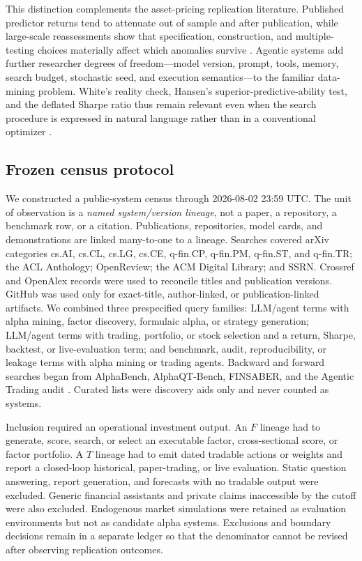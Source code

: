 This distinction complements the asset-pricing replication literature.
Published predictor returns tend to attenuate out of sample and after
publication, while large-scale reassessments show that specification,
construction, and multiple-testing choices materially affect which anomalies
survive \citep{McLeanPontiff2016,HarveyLiuZhu2016,hou2020replicating,ChenZimmermann2022,JensenKellyPedersen2023}.
Agentic systems add further researcher degrees of freedom---model version,
prompt, tools, memory, search budget, stochastic seed, and execution
semantics---to the familiar data-mining problem.  White's reality check,
Hansen's superior-predictive-ability test, and the deflated Sharpe ratio thus
remain relevant even when the search procedure is expressed in natural
language rather than in a conventional optimizer
\citep{White2000RealityCheck,Hansen2005SPA}.

\subsection{Frozen census protocol}

We constructed a public-system census through 2026-08-02 23:59 UTC.  The unit
of observation is a \emph{named system/version lineage}, not a paper, a
repository, a benchmark row, or a citation.  Publications, repositories,
model cards, and demonstrations are linked many-to-one to a lineage.  Searches
covered arXiv categories cs.AI, cs.CL, cs.LG, cs.CE, q-fin.CP, q-fin.PM,
q-fin.ST, and q-fin.TR; the ACL Anthology; OpenReview; the ACM Digital Library;
and SSRN.  Crossref and OpenAlex records were used to reconcile titles and
publication versions.  GitHub was used only for exact-title, author-linked, or
publication-linked artifacts.  We combined three prespecified query families:
LLM/agent terms with alpha mining, factor discovery, formulaic alpha, or
strategy generation; LLM/agent terms with trading, portfolio, or stock
selection and a return, Sharpe, backtest, or live-evaluation term; and
benchmark, audit, reproducibility, or leakage terms with alpha mining or
trading agents.  Backward and forward searches began from AlphaBench,
AlphaQT-Bench, FINSABER, and the Agentic Trading audit
\citep{alphabench2026,LuoEtAl2026AlphaQT,LiEtAl2026FINSABER,XiaEtAl2026AgenticTrading}.
Curated lists were discovery aids only and never counted as systems.

Inclusion required an operational investment output.  An \(F\) lineage had to
generate, score, search, or select an executable factor, cross-sectional score,
or factor portfolio.  A \(T\) lineage had to emit dated tradable actions or
weights and report a closed-loop historical, paper-trading, or live
evaluation.  Static question answering, report generation, and forecasts with
no tradable output were excluded.  Generic financial assistants and private
claims inaccessible by the cutoff were also excluded.  Endogenous market
simulations were retained as evaluation environments but not as candidate
alpha systems.  Exclusions and boundary decisions remain in a separate ledger
so that the denominator cannot be revised after observing replication outcomes.

